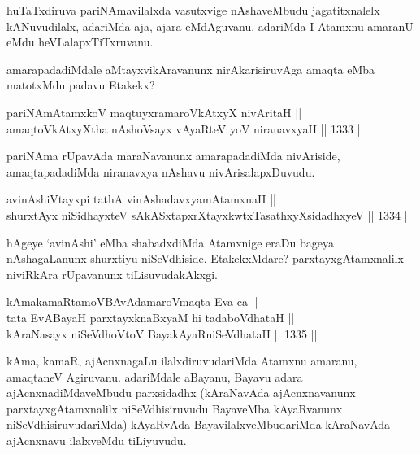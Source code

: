 \begin{artha}
huTaTxdiruva pariNAmavilalxda vasutxvige nAshaveMbudu jagatitxnalelx kANuvudilalx, adariMda aja, ajara eMdAguvanu, adariMda I Atamxnu amaranU eMdu heVLalapxTiTxruvanu.
\end{artha}

\begin{artha}
amarapadadiMdale aMtayxvikAravanunx nirAkarisiruvAga amaqta eMba matotxMdu padavu Etakekx?
\end{artha}

\begin{shl}
pariNAmAtamxkoV maqtuyxramaroVkAtxyX nivAritaH || \\
amaqtoVkAtxyX\s tha nAshoV\s sayx vAyaRteV yoV niranavxyaH \hfill || 1333 ||  
\end{shl}

\begin{artha}
pariNAma rUpavAda maraNavanunx amarapadadiMda nivAriside, amaqtapadadiMda niranavxya nAshavu nivArisalapxDuvudu.
\end{artha}

\begin{shl}
avinAshiVtayxpi tathA vinAshadavxyamAtamxnaH || \\
shurxtAyx niSidhayxteV sAkASxtapxrXtayxkwtxTasathxyXsidadhxyeV \hfill || 1334 ||  
\end{shl}

\begin{artha}
hAgeye `avinAshi' eMba shabadxdiMda Atamxnige eraDu bageya nAshagaLanunx shurxtiyu niSeVdhiside. EtakekxMdare? parxtayxgAtamxnalilx niviRkAra rUpavanunx tiLisuvudakAkxgi.
\end{artha}

\begin{shl}
kAmakamaRtamoVBAvAdamaroV\s maqta Eva ca || \\
tata EvABayaH parxtayxknaBxyaM hi tadaboVdhataH || \\
kAraNasayx niSeVdhoV\s toV BayakAyaRniSeVdhataH \hfill || 1335 ||  
\end{shl}

\begin{artha}
kAma, kamaR, ajAcnxnagaLu ilalxdiruvudariMda Atamxnu amaranu, amaqtaneV Agiruvanu. adariMdale aBayanu, Bayavu adara ajAcnxnadiMdaveMbudu parxsidadhx (kAraNavAda ajAcnxnavanunx parxtayxgAtamxnalilx niSeVdhisiruvudu BayaveMba kAyaRvanunx niSeVdhisiruvudariMda) kAyaRvAda BayavilalxveMbudariMda kAraNavAda ajAcnxnavu ilalxveMdu tiLiyuvudu.
\end{artha}

